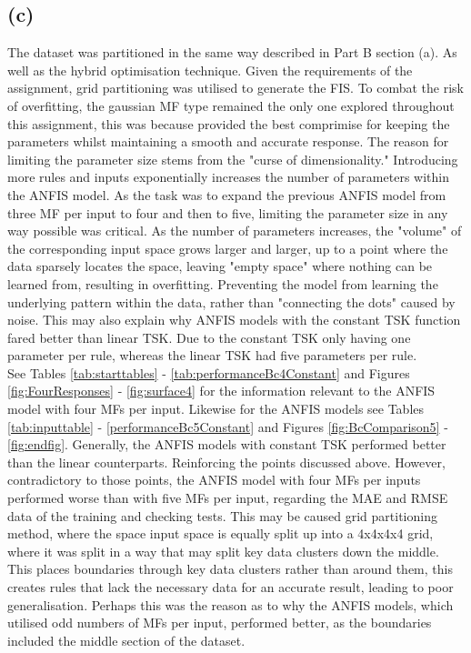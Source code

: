 \documentclass[12pt]{article}
\begin{document}
\subsection{(c)}

The dataset was partitioned in the same way described in Part B section (a).
As well as the hybrid optimisation technique.
Given the requirements of the assignment, grid partitioning was utilised to generate the FIS.
To combat the risk of overfitting, the gaussian MF type remained the only one explored throughout this assignment, this was because provided the best comprimise for keeping the parameters whilst maintaining a smooth and accurate response.
The reason for limiting the parameter size stems from the "curse of dimensionality." 
Introducing more rules and inputs exponentially increases the number of parameters within the ANFIS model.
As the task was to expand the previous ANFIS model from three MF per input to four and then to five, limiting the parameter size in any way possible was critical.
As the number of parameters increases, the "volume" of the corresponding input space grows larger and larger, up to a point where the data sparsely locates the space, leaving "empty space" where nothing can be learned from, resulting in overfitting.
Preventing the model from learning the underlying pattern within the data, rather than "connecting the dots" caused by noise.
This may also explain why ANFIS models with the constant TSK function fared better than linear TSK.
Due to the constant TSK only having one parameter per rule, whereas the linear TSK had five parameters per rule.
\\

See Tables \ref{tab:starttables} - \ref{tab:performanceBc4Constant} and Figures \ref{fig:FourResponses} - \ref{fig:surface4} for the information relevant to the ANFIS model with four MFs per input.
Likewise for the ANFIS models see Tables \ref{tab:inputtable} - \ref{performanceBc5Constant} and Figures \ref{fig:BcComparison5} -\ref{fig:endfig}.
Generally, the ANFIS models with constant TSK performed better than the linear counterparts.
Reinforcing the points discussed above. 
However, contradictory to those points, the ANFIS model with four MFs per inputs performed worse than with five MFs per input, regarding the MAE and RMSE data of the training and checking tests. 
This may be caused grid partitioning method, where the space input space is equally split up into a 4x4x4x4 grid, where it was split in a way that may split key data clusters down the middle.
This places boundaries through key data clusters rather than around them, this creates rules that lack the necessary data for an accurate result, leading to poor generalisation. 
Perhaps this was the reason as to why the ANFIS models, which utilised odd numbers of MFs per input, performed better, as the boundaries included the middle section of the dataset. 
\\
\end{document}
